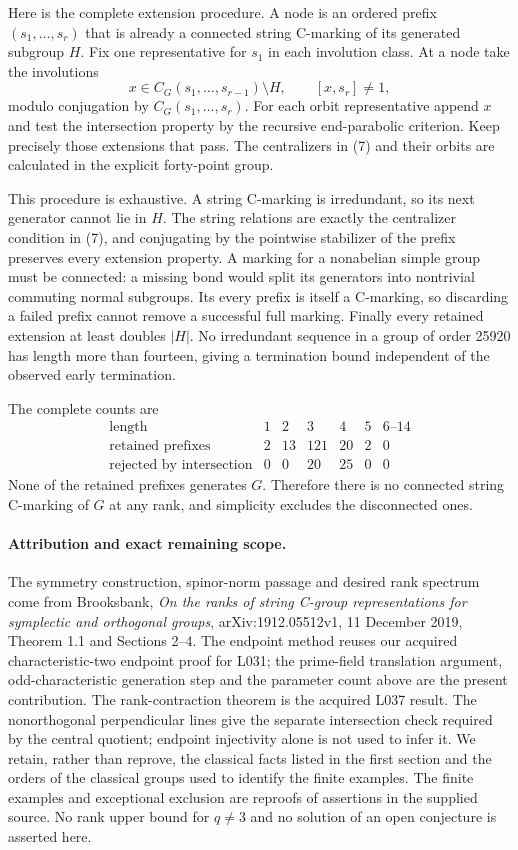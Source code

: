 \documentclass[11pt,a4paper]{article}
\begin{document}
Here is the complete extension procedure. A node is an ordered
prefix $(s_1,\ldots,s_r)$ that is already a connected string
C-marking of its generated subgroup $H$. Fix one representative
for $s_1$ in each involution class. At a node take the involutions
\[
 x\in C_G(s_1,\ldots,s_{r-1})\setminus H,
       \qquad [x,s_r]\ne1,                              \tag{7}
\]
modulo conjugation by $C_G(s_1,\ldots,s_r)$. For each orbit
representative append $x$ and test the intersection property
by the recursive end-parabolic criterion. Keep precisely those
extensions that pass. The centralizers in (7) and their orbits
are calculated in the explicit forty-point group.

This procedure is exhaustive. A string C-marking is irredundant,
so its next generator cannot lie in $H$. The string relations
are exactly the centralizer condition in (7), and conjugating by
the pointwise stabilizer of the prefix preserves every extension
property. A marking for a nonabelian simple group must be connected:
a missing bond would split its generators into nontrivial
commuting normal subgroups. Its every prefix is itself a C-marking,
so discarding a failed prefix cannot remove a successful full
marking. Finally every retained extension at least doubles $|H|$.
No irredundant sequence in a group of order 25920 has length more
than fourteen, giving a termination bound independent of the
observed early termination.

The complete counts are
\[
\begin{array}{c|rrrrrr}
\text{length}&1&2&3&4&5&6\text{--}14\\\hline
\text{retained prefixes}&2&13&121&20&2&0\\
\text{rejected by intersection}&0&0&20&25&0&0
\end{array}                                                     \tag{8}
\]
None of the retained prefixes generates $G$. Therefore there is
no connected string C-marking of $G$ at any rank, and simplicity
excludes the disconnected ones.

\paragraph{Attribution and exact remaining scope.}
The symmetry construction, spinor-norm passage and desired rank
spectrum come from Brooksbank, \emph{On the ranks of string C-group
representations for symplectic and orthogonal groups},
arXiv:1912.05512v1, 11 December 2019, Theorem 1.1 and Sections 2--4.
The endpoint method reuses our acquired characteristic-two
endpoint proof for L031; the prime-field translation argument,
odd-characteristic generation step and the parameter count above
are the present contribution. The rank-contraction theorem is the
acquired L037 result. The nonorthogonal perpendicular lines give
the separate intersection check required by the central quotient;
endpoint injectivity alone is not used to infer it. We retain,
rather than reprove, the
classical facts listed in the first section and the orders of the
classical groups used to identify the finite examples. The finite
examples and exceptional exclusion are reproofs of assertions in
the supplied source. No rank upper bound for $q\ne3$ and no
solution of an open conjecture is asserted here.
\end{document}
